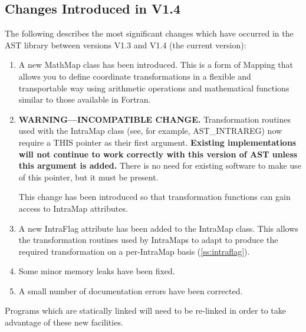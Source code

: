 \documentclass[twoside,11pt]{article}
\newcommand{\htmlref}[2]{#1}
\newcommand{\xlabel}[1]{}
\newcommand{\secref}[1]{\S\ref{#1}}
\renewcommand{\secref}[1]{\ref{#1}}
\begin{document}
\subsection{\xlabel{changes}\xlabel{list_of_most_recent_changes}Changes Introduced in V1.4}

The following describes the most significant changes which have
occurred in the AST library between versions V1.3 and V1.4 (the
current version):

\begin{enumerate}
\item A new \htmlref{MathMap}{MathMap} class has been introduced. This is a form of
\htmlref{Mapping}{Mapping} that allows you to define coordinate transformations in a
flexible and transportable way using arithmetic operations and
mathematical functions similar to those available in Fortran.

\item {\bf{WARNING---INCOMPATIBLE CHANGE.}} Transformation routines
used with the \htmlref{IntraMap}{IntraMap} class (see, for example, \htmlref{AST\_INTRAREG}{AST_INTRAREG}) now
require a THIS pointer as their first argument. {\bf{Existing
implementations will not continue to work correctly with this version
of AST unless this argument is added.}} There is no need for existing
software to make use of this pointer, but it must be present.

This change has been introduced so that transformation functions can gain
access to IntraMap attributes.

\item A new \htmlref{IntraFlag}{IntraFlag} attribute has been added to the IntraMap
class. This allows the transformation routines used by IntraMaps to
adapt to produce the required transformation on a per-IntraMap basis
(\secref{ss:intraflag}).

\item Some minor memory leaks have been fixed.

\item A small number of documentation errors have been corrected.
\end{enumerate}

Programs which are statically linked will need to be re-linked in
order to take advantage of these new facilities.
\end{document}
